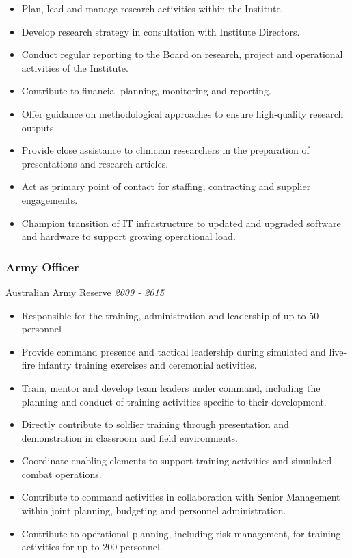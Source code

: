 \documentclass[
  letterpaper,
  DIV=11,
  numbers=noendperiod]{scrartcl}
\providecommand{\tightlist}{%
  \setlength{\itemsep}{0pt}\setlength{\parskip}{0pt}}\usepackage{longtable,booktabs,array}
\begin{document}
\begin{itemize}
\tightlist
\item
  Plan, lead and manage research activities within the Institute.
\item
  Develop research strategy in consultation with Institute Directors.
\item
  Conduct regular reporting to the Board on research, project and
  operational activities of the Institute.
\item
  Contribute to financial planning, monitoring and reporting.
\item
  Offer guidance on methodological approaches to ensure high-quality
  research outputs.
\item
  Provide close assistance to clinician researchers in the preparation
  of presentations and research articles.
\item
  Act as primary point of contact for staffing, contracting and supplier
  engagements.
\item
  Champion transition of IT infrastructure to updated and upgraded
  software and hardware to support growing operational load.
\end{itemize}

\subsubsection{Army Officer}\label{army-officer}

Australian Army Reserve {\emph{2009 - 2015}}

\begin{itemize}
\tightlist
\item
  Responsible for the training, administration and leadership of up to
  50 personnel
\item
  Provide command presence and tactical leadership during simulated and
  live-fire infantry training exercises and ceremonial activities.
\item
  Train, mentor and develop team leaders under command, including the
  planning and conduct of training activities specific to their
  development.
\item
  Directly contribute to soldier training through presentation and
  demonstration in classroom and field environments.
\item
  Coordinate enabling elements to support training activities and
  simulated combat operations.
\item
  Contribute to command activities in collaboration with Senior
  Management within joint planning, budgeting and personnel
  administration.
\item
  Contribute to operational planning, including risk management, for
  training activities for up to 200 personnel.
\end{itemize}
\end{document}
